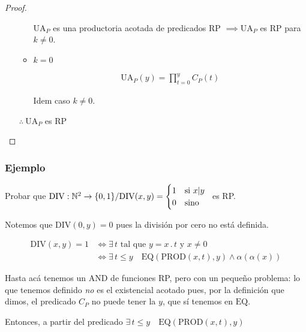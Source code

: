 \begin{proof}
\begin{itemize}
\begin{itemize}
            $\mathrm{UA}_P$ es una productoria acotada de predicados RP
            $\implies \mathrm{UA}_P$ es RP para $k \neq 0$.

        \item $k=0$

            \begin{gather*}
                \mathrm{UA}_P (y) = \prod_{t=0}^y C_P (t)
            \end{gather*}

            Idem caso $k \neq 0$.
        \end{itemize}

        \begin{center}
            $\therefore ~ \mathrm{UA}_P$ es RP
        \end{center}
    \end{itemize}
\end{proof}


\subsubsection{Ejemplo}

Probar que $\mathrm{DIV}: \mathbb{N}^2 \to \{ 0,1 \} / 
\mathrm{DIV}(x,y) = \begin{cases}
    1 & \text{si } \divides{x}{y}\\
    0 & \text{sino}
\end{cases} ~$
es RP.

Notemos que $\mathrm{DIV} (0,y) = 0$ pues la división por cero no está 
definida.

\begin{align*}
    \mathrm{DIV}(x,y) = 1 
    &\iff \exists \, t \text{ tal que } y = x \, . \, t \text{ y } x \neq 0 \\
    &\iff \exists \, t \leq y \quad \mathrm{EQ}(\mathrm{PROD}(x,t),y)
    \wedge \alpha(\alpha(x))
\end{align*}

Hasta acá tenemos un $\mathrm{AND}$ de funciones RP, pero con un pequeño
%
problema: lo que tenemos definido \textit{no} es el existencial acotado pues,
por la definición que dimos, el predicado $C_P$ no puede tener la $y$, que
sí tenemos en $\mathrm{EQ}$.

Entonces, a partir del predicado 
$\exists \, t \leq y \quad \mathrm{EQ}(\mathrm{PROD}(x,t),y)$ 

